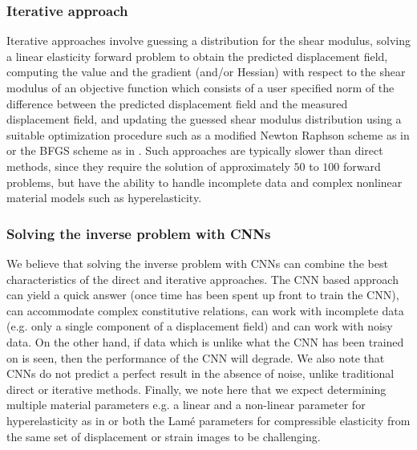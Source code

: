 \documentclass[10pt]{article}
\begin{document}
\subsubsection{Iterative approach} Iterative approaches \cite{paper:oberai2003,paper:gokhale2008,paper:kalle1996,paper:doyley,paper:goenezen2011} involve guessing a distribution for the shear modulus, solving a linear elasticity forward problem to obtain the predicted displacement field, computing the value and the gradient (and/or Hessian) with respect to the shear modulus of an objective function which consists of a user specified norm of the difference between the predicted displacement field and the measured displacement field, and updating the guessed shear modulus distribution using a suitable optimization procedure such as a modified Newton Raphson scheme as in \cite{paper:doyley} or the BFGS scheme as in \cite{paper:gokhale2008,paper:goenezen2011}. Such approaches are typically slower than direct methods, since they require the solution of approximately $50$ to $100$ forward problems, but have the ability to handle incomplete data and complex nonlinear material models such as hyperelasticity.
\subsubsection{Solving the inverse problem with CNNs}
We believe that solving the inverse problem with CNNs can combine the best characteristics of the direct and iterative approaches. The CNN based approach can yield a quick answer (once time has been spent up front to train the CNN), can accommodate complex constitutive relations, can work with incomplete data (e.g. only a single component of a displacement field) and can work with noisy data. On the other hand, if data which is unlike what the CNN has been trained on is seen, then the performance of the CNN will degrade. We also note that CNNs do not predict a perfect result in the absence of noise, unlike traditional direct or iterative methods. Finally, we note here that we expect determining multiple material parameters e.g. a linear and a non-linear parameter for hyperelasticity as in \cite{paper:gokhale2008,paper:goenezen2011}or both the Lam\'e parameters for compressible elasticity from the same set of displacement or strain images to be challenging.
\end{document}
